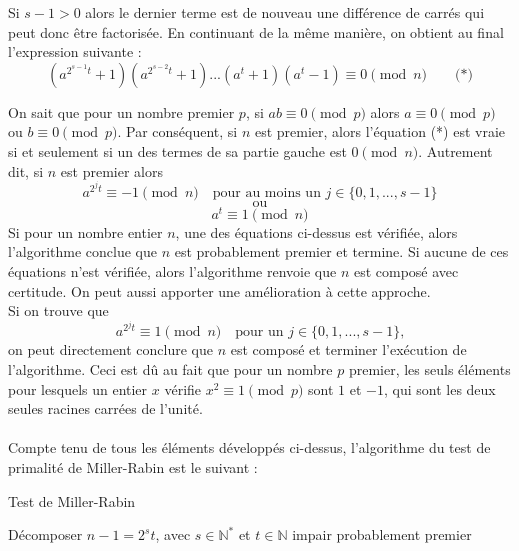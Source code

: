 		Si $s - 1 > 0$ alors le dernier terme est de nouveau une différence de carrés qui peut donc être factorisée. En continuant de la même manière, on obtient au final l'expression suivante :
		\[ (a^{2^{s-1}t} + 1)(a^{2^{s-2}t} + 1)...(a^{t} + 1)(a^{t} - 1) \equiv 0 \pmod n \quad\quad \text{(*)}\]
		
		On sait que pour un nombre premier $p$, si $ab \equiv 0 \pmod p$ alors $a \equiv 0 \pmod p$ ou $b \equiv 0 \pmod p$. Par conséquent, si $n$ est premier, alors l'équation (*) est vraie si et seulement si un des termes de sa partie gauche est $0 \pmod n$. Autrement dit, si $n$ est premier alors
		\[ a^{2^{j}t} \equiv -1 \pmod n \quad \text{pour au moins un } j \in \{0, 1, ..., s-1\} \]
		\[\text{ou}\]
		\[ a^{t} \equiv 1 \pmod n\]
		Si pour un nombre entier $n$, une des équations ci-dessus est vérifiée, alors l'algorithme conclue que $n$ est probablement premier et termine. Si aucune de ces équations n'est vérifiée, alors l'algorithme renvoie que $n$ est composé avec certitude. On peut aussi apporter une amélioration à cette approche.\\
		Si on trouve que
		\[ a^{2^{j}t} \equiv 1 \pmod n \quad \text{pour un } j \in \{0, 1, ..., s-1\} \text{,}\]
		on peut directement conclure que $n$ est composé et terminer l'exécution de l'algorithme. Ceci est dû au fait que pour un nombre $p$ premier, les seuls éléments pour lesquels un entier $x$ vérifie $x^{2} \equiv 1 \pmod p$ sont $1$ et $-1$, qui sont les deux seules racines carrées de l'unité.
		
		\paragraph{} Compte tenu de tous les éléments développés ci-dessus, l'algorithme du test de primalité de Miller-Rabin est le suivant :\\
		
		\begin{algorithm}[H]
			\caption{Test de Miller-Rabin}\label{TF}
			{Décomposer $n - 1 = 2^{s}t$, avec $s \in \mathbb{N}^{*}$ et $t \in \mathbb{N}$ impair \;}
			\Retour probablement premier\;
		\end{algorithm}
	
